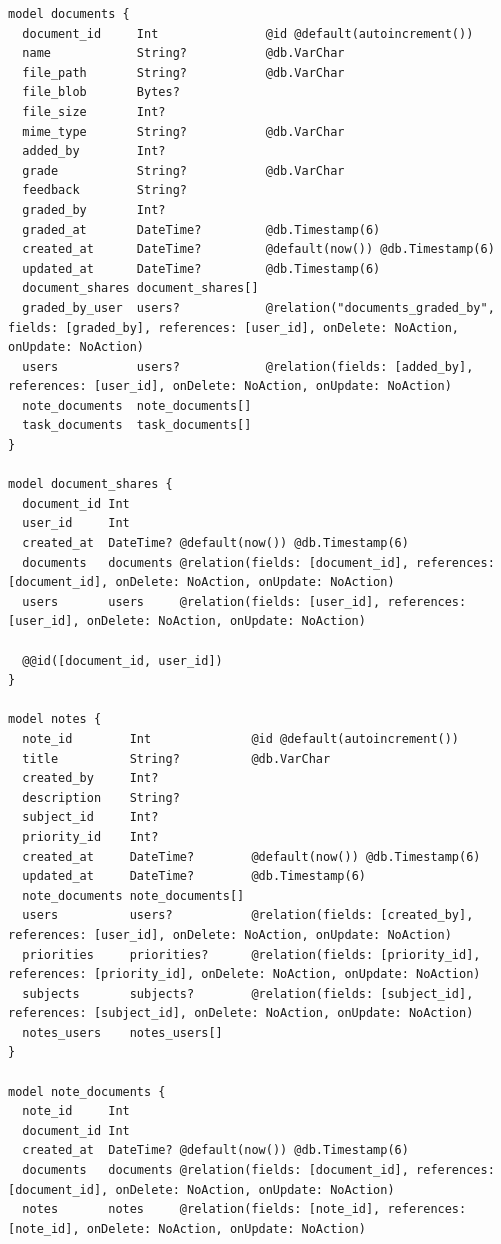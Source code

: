 \begin{listing}[H]
\begin{verbatim}
model documents {
  document_id     Int               @id @default(autoincrement())
  name            String?           @db.VarChar
  file_path       String?           @db.VarChar
  file_blob       Bytes?
  file_size       Int?
  mime_type       String?           @db.VarChar
  added_by        Int?
  grade           String?           @db.VarChar
  feedback        String?
  graded_by       Int?
  graded_at       DateTime?         @db.Timestamp(6)
  created_at      DateTime?         @default(now()) @db.Timestamp(6)
  updated_at      DateTime?         @db.Timestamp(6)
  document_shares document_shares[]
  graded_by_user  users?            @relation("documents_graded_by", fields: [graded_by], references: [user_id], onDelete: NoAction, onUpdate: NoAction)
  users           users?            @relation(fields: [added_by], references: [user_id], onDelete: NoAction, onUpdate: NoAction)
  note_documents  note_documents[]
  task_documents  task_documents[]
}

model document_shares {
  document_id Int
  user_id     Int
  created_at  DateTime? @default(now()) @db.Timestamp(6)
  documents   documents @relation(fields: [document_id], references: [document_id], onDelete: NoAction, onUpdate: NoAction)
  users       users     @relation(fields: [user_id], references: [user_id], onDelete: NoAction, onUpdate: NoAction)

  @@id([document_id, user_id])
}

model notes {
  note_id        Int              @id @default(autoincrement())
  title          String?          @db.VarChar
  created_by     Int?
  description    String?
  subject_id     Int?
  priority_id    Int?
  created_at     DateTime?        @default(now()) @db.Timestamp(6)
  updated_at     DateTime?        @db.Timestamp(6)
  note_documents note_documents[]
  users          users?           @relation(fields: [created_by], references: [user_id], onDelete: NoAction, onUpdate: NoAction)
  priorities     priorities?      @relation(fields: [priority_id], references: [priority_id], onDelete: NoAction, onUpdate: NoAction)
  subjects       subjects?        @relation(fields: [subject_id], references: [subject_id], onDelete: NoAction, onUpdate: NoAction)
  notes_users    notes_users[]
}

model note_documents {
  note_id     Int
  document_id Int
  created_at  DateTime? @default(now()) @db.Timestamp(6)
  documents   documents @relation(fields: [document_id], references: [document_id], onDelete: NoAction, onUpdate: NoAction)
  notes       notes     @relation(fields: [note_id], references: [note_id], onDelete: NoAction, onUpdate: NoAction)


\end{verbatim}
\end{listing}
